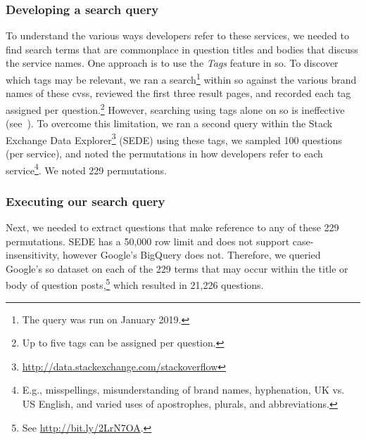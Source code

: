 
\subsubsection{Developing a search query}

To understand the various ways developers refer to these services, we needed to find search terms that are commonplace in question titles and bodies that discuss the service names. One approach is to use the \textit{Tags} feature in \gls{so}. To discover which tags may be relevant, we ran a search\footnote{The query was run on January 2019.} within \gls{so} against the various brand names of these \glspl{cvs}, reviewed the first three result pages, and recorded each tag assigned per question.\footnote{Up to five tags can be assigned per question.} However, searching using tags alone on \gls{so} is ineffective (see~\citep{Tahir:2018ks,Barua:2012gz}).
To overcome this limitation, we ran a second query within the Stack Exchange Data Explorer\footnote{\url{http://data.stackexchange.com/stackoverflow}} (SEDE) using these tags, we sampled 100 questions (per service), and noted the permutations in how developers refer to each service\footnote{E.g., misspellings, misunderstanding of brand names, hyphenation, UK vs. US English, and varied uses of apostrophes, plurals, and abbreviations.}. We noted 229 permutations.

\subsubsection{Executing our search query}

Next, we needed to extract questions that make reference to any of these 229 permutations. SEDE has a 50,000 row limit and does not support case-insensitivity, however Google's BigQuery does not. Therefore, we queried Google's \gls{so} dataset on each of the 229 terms that may occur within the title or body of question posts,\footnote{See \url{http://bit.ly/2LrN7OA}.} which resulted in 21,226 questions.

